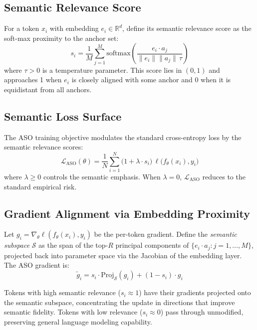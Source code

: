\documentclass[11pt,a4paper]{article}
\begin{document}
\subsection{Semantic Relevance Score}

For a token $x_i$ with embedding $e_i \in \mathbb{R}^d$, define its semantic relevance
score as the soft-max proximity to the anchor set:
\begin{equation}
    s_i = \frac{1}{M} \sum_{j=1}^{M}
          \text{softmax}\!\left(\frac{e_i \cdot a_j}{\|e_i\|\|a_j\|\,\tau}\right)
    \label{eq:relevance_score}
\end{equation}
where $\tau > 0$ is a temperature parameter. This score lies in $(0,1)$ and approaches
1 when $e_i$ is closely aligned with some anchor and 0 when it is equidistant from all
anchors.

\subsection{Semantic Loss Surface}

The ASO training objective modulates the standard cross-entropy loss by the semantic
relevance scores:
\begin{equation}
    \mathcal{L}_{\text{ASO}}(\theta) =
        \frac{1}{N}\sum_{i=1}^{N}
        \bigl(1 + \lambda \cdot s_i\bigr)\,\ell\bigl(f_\theta(x_i), y_i\bigr)
    \label{eq:aso_loss}
\end{equation}
where $\lambda \geq 0$ controls the semantic emphasis. When $\lambda = 0$,
$\mathcal{L}_{\text{ASO}}$ reduces to the standard empirical risk.

\subsection{Gradient Alignment via Embedding Proximity}

Let $g_i = \nabla_\theta \ell(f_\theta(x_i), y_i)$ be the per-token gradient.
Define the \emph{semantic subspace} $\mathcal{S}$ as the span of the top-$R$ principal
components of $\{e_i \cdot a_j : j = 1,\ldots,M\}$, projected back into parameter space
via the Jacobian of the embedding layer. The ASO gradient is:
\begin{equation}
    \tilde{g}_i = s_i \cdot \text{Proj}_{\mathcal{S}}(g_i) +
                  (1 - s_i) \cdot g_i
    \label{eq:projected_gradient}
\end{equation}

Tokens with high semantic relevance ($s_i \approx 1$) have their gradients projected
onto the semantic subspace, concentrating the update in directions that improve
semantic fidelity. Tokens with low relevance ($s_i \approx 0$) pass through
unmodified, preserving general language modeling capability.
\end{document}
